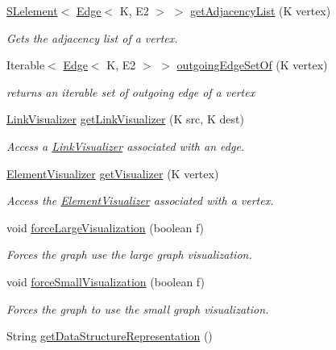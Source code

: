\begin{DoxyCompactItemize}
\hyperlink{classbridges_1_1base_1_1_s_lelement}{S\+Lelement}$<$ \hyperlink{classbridges_1_1base_1_1_edge}{Edge}$<$ K, E2 $>$ $>$ \hyperlink{classbridges_1_1base_1_1_graph_adj_list_aa8d25bc56b9a172999f0c62ee7e04b6f}{get\+Adjacency\+List} (K vertex)
\begin{DoxyCompactList}\small\item\em Gets the adjacency list of a vertex. \end{DoxyCompactList}\item 
Iterable$<$ \hyperlink{classbridges_1_1base_1_1_edge}{Edge}$<$ K, E2 $>$ $>$ \hyperlink{classbridges_1_1base_1_1_graph_adj_list_a084693f2f464b8f1d21d5ed2a864bf46}{outgoing\+Edge\+Set\+Of} (K vertex)
\begin{DoxyCompactList}\small\item\em returns an iterable set of outgoing edge of a vertex \end{DoxyCompactList}\item 
\hyperlink{classbridges_1_1base_1_1_link_visualizer}{Link\+Visualizer} \hyperlink{classbridges_1_1base_1_1_graph_adj_list_af93888dbd2a768a2401619ad5dc95560}{get\+Link\+Visualizer} (K src, K dest)
\begin{DoxyCompactList}\small\item\em Access a \hyperlink{classbridges_1_1base_1_1_link_visualizer}{Link\+Visualizer} associated with an edge. \end{DoxyCompactList}\item 
\hyperlink{classbridges_1_1base_1_1_element_visualizer}{Element\+Visualizer} \hyperlink{classbridges_1_1base_1_1_graph_adj_list_aafb45833cd5c13b6ce9bdece3fefde6a}{get\+Visualizer} (K vertex)
\begin{DoxyCompactList}\small\item\em Access the \hyperlink{classbridges_1_1base_1_1_element_visualizer}{Element\+Visualizer} associated with a vertex. \end{DoxyCompactList}\item 
void \hyperlink{classbridges_1_1base_1_1_graph_adj_list_a0e2dff032458bb03cb778b571ddcc9b6}{force\+Large\+Visualization} (boolean f)
\begin{DoxyCompactList}\small\item\em Forces the graph use the large graph visualization. \end{DoxyCompactList}\item 
void \hyperlink{classbridges_1_1base_1_1_graph_adj_list_ae14e51214742db0c4dab26c1d409f4ed}{force\+Small\+Visualization} (boolean f)
\begin{DoxyCompactList}\small\item\em Forces the graph to use the small graph visualization. \end{DoxyCompactList}\item 
String \hyperlink{classbridges_1_1base_1_1_graph_adj_list_a9bba66056cdf24197c41fff455e19a6c}{get\+Data\+Structure\+Representation} ()
\end{DoxyCompactItemize}
